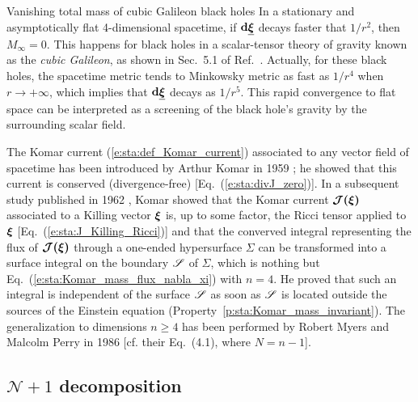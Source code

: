 \begin{texample}{Vanishing total mass of cubic Galileon black holes}{}
In a stationary and asymptotically flat 4-dimensional spacetime, if $\mathbf{d}\underline{\bm{\xi}}$
decays faster that $1/r^2$, then $M_\infty = 0$.
This happens for black holes in a scalar-tensor theory of gravity known as the \emph{cubic Galileon}, as shown in Sec.~5.1 of Ref.~\cite{VanaeGGC20}.
Actually, for these black holes, the spacetime metric tends to Minkowsky metric as fast as
$1/r^4$ when $r\to +\infty$, which implies that $\mathbf{d}\underline{\bm{\xi}}$ decays as $1/r^5$.
This rapid convergence to flat space can be interpreted as a screening of the
black hole's gravity by the surrounding scalar field.
\end{texample}


\begin{hist}
The Komar current (\ref{e:sta:def_Komar_current}) associated to any vector field
of spacetime has been introduced by Arthur Komar in 1959 \cite{Komar59};
he showed that this current is conserved (divergence-free) [Eq.~(\ref{e:sta:divJ_zero})].
In a subsequent study published in  1962 \cite{Komar62}, Komar showed that
the Komar current $\bm{\mathcal{J}}\textbf{(}\bm{\xi}\textbf{)}$ associated to a Killing vector $\bm{\xi}$ is, up to some factor, the
Ricci tensor applied to $\bm{\xi}$ [Eq.~(\ref{e:sta:J_Killing_Ricci})] and that
the converved integral representing the flux of $\bm{\mathcal{J}}\textbf{(}\bm{\xi}\textbf{)}$ through a one-ended hypersurface $\Sigma$
can be transformed into a surface integral on the boundary $\mathscr{S}$ of $\Sigma$,
which is nothing but Eq.~(\ref{e:sta:Komar_mass_flux_nabla_xi}) with $n=4$.
He proved that such an integral is independent of the surface $\mathscr{S}$ as soon as
$\mathscr{S}$ is located outside the sources of the Einstein equation
(Property~\ref{p:sta:Komar_mass_invariant}). The generalization to
dimensions $n\geq 4$ has been performed by
Robert Myers and Malcolm Perry in 1986 \cite{MyersP86}
[cf. their Eq.~(4.1), where $N=n-1$].
\end{hist}

\subsection{\texorpdfstring{$\mathcal{N}+1$}{N+1} decomposition} \label{s:sta:np1_decomp}

